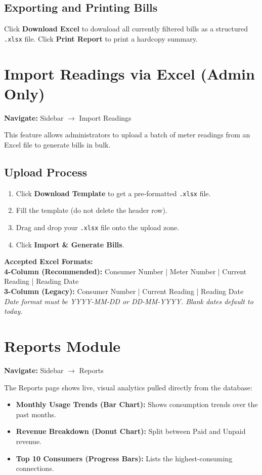 \documentclass[12pt, a4paper]{report}
\begin{document}
\subsection{Exporting and Printing Bills}
Click \textbf{Download Excel} to download all currently filtered bills as a structured \texttt{.xlsx} file. Click \textbf{Print Report} to print a hardcopy summary.

\section{Import Readings via Excel (Admin Only)}

\textbf{Navigate:} Sidebar $\rightarrow$ Import Readings

This feature allows administrators to upload a batch of meter readings from an Excel file to generate bills in bulk.

\subsection{Upload Process}
\begin{enumerate}
    \item Click \textbf{Download Template} to get a pre-formatted \texttt{.xlsx} file.
    \item Fill the template (do not delete the header row).
    \item Drag and drop your \texttt{.xlsx} file onto the upload zone.
    \item Click \textbf{Import \& Generate Bills}.
\end{enumerate}

\begin{tipbox}
\textbf{Accepted Excel Formats:}\\
\textbf{4-Column (Recommended):} Consumer Number | Meter Number | Current Reading | Reading Date\\
\textbf{3-Column (Legacy):} Consumer Number | Current Reading | Reading Date\\
\textit{Date format must be YYYY-MM-DD or DD-MM-YYYY. Blank dates default to today.}
\end{tipbox}

\section{Reports Module}

\textbf{Navigate:} Sidebar $\rightarrow$ Reports

The Reports page shows live, visual analytics pulled directly from the database:
\begin{itemize}
    \item \textbf{Monthly Usage Trends (Bar Chart):} Shows consumption trends over the past months.
    \item \textbf{Revenue Breakdown (Donut Chart):} Split between Paid and Unpaid revenue.
    \item \textbf{Top 10 Consumers (Progress Bars):} Lists the highest-consuming connections.
\end{itemize}
\end{document}
